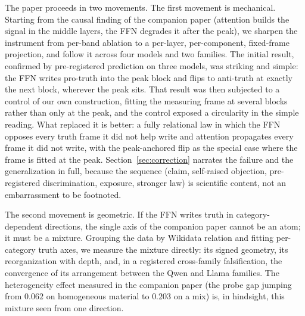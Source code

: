 \documentclass[11pt]{article}
\begin{document}
The paper proceeds in two movements. The first movement is mechanical.
Starting from the causal finding of the companion paper (attention builds the
signal in the middle layers, the FFN degrades it after the peak), we sharpen
the instrument from per-band ablation to a per-layer, per-component,
fixed-frame projection, and follow it across four models and two families.
The initial result, confirmed by pre-registered prediction on three models,
was striking and simple: the FFN writes pro-truth into the peak block and
flips to anti-truth at exactly the next block, wherever the peak sits. That
result was then subjected to a control of our own construction, fitting the
measuring frame at several blocks rather than only at the peak, and the
control exposed a circularity in the simple reading. What replaced it is
better: a fully relational law in which the FFN opposes every truth frame it
did not help write and attention propagates every frame it did not write,
with the peak-anchored flip as the special case where the frame is fitted at
the peak. Section~\ref{sec:correction} narrates the failure and the
generalization in full, because the sequence (claim, self-raised objection,
pre-registered discrimination, exposure, stronger law) is scientific content,
not an embarrassment to be footnoted.

The second movement is geometric. If the FFN writes truth in
category-dependent directions, the single axis of the companion paper cannot
be an atom; it must be a mixture. Grouping the data by Wikidata relation and
fitting per-category truth axes, we measure the mixture directly: its signed
geometry, its reorganization with depth, and, in a registered cross-family
falsification, the convergence of its arrangement between the Qwen and Llama
families. The heterogeneity effect measured in the companion paper (the probe
gap jumping from $0.062$ on homogeneous material to $0.203$ on a mix) is,
in hindsight, this mixture seen from one direction.
\end{document}
